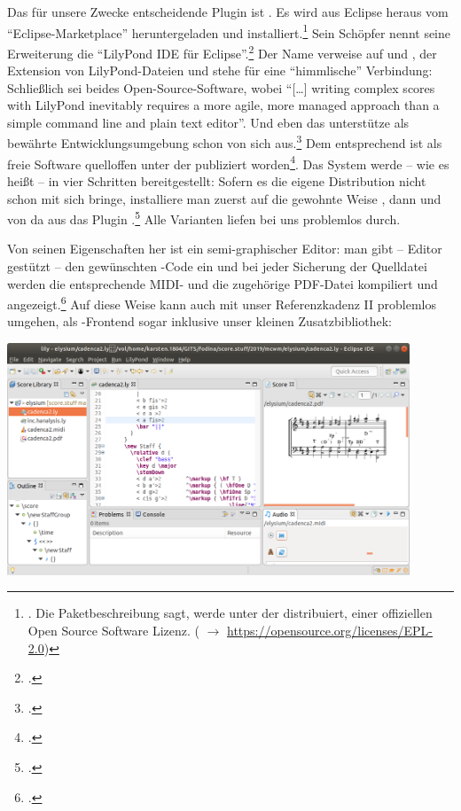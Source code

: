 Das für unsere Zwecke entscheidende Plugin ist . Es wird aus
Eclipse heraus vom \enquote{Eclipse-Marketplace} heruntergeladen und
installiert.\footnote{\cite[vgl.][\nopage wp.]{Harmath2019a}. Die
Paketbeschreibung sagt,  werde unter der  distribuiert, einer offiziellen Open Source Software Lizenz.
( $\rightarrow$ \href{https://opensource.org/licenses/EPL-2.0}
{https://opensource.org/licenses/EPL-2.0}) } Sein Schöpfer nennt seine
Erweiterung die \enquote{LilyPond IDE für Eclipse}.\footcite[vgl.][\nopage
wp.]{Harmath2019b} Der Name  verweise auf  und
, der Extension von LilyPond-Dateien und stehe für eine
\enquote{himmlische} Verbindung: Schließlich sei beides Open-Source-Software,
wobei \enquote{[\ldots] writing complex scores with LilyPond inevitably requires
a more agile, more managed approach than a simple command line and plain text
editor}. Und eben das unterstütze  als bewährte
Entwicklungsumgebung schon von sich aus.\footcite[vgl.][\nopage
wp.]{Harmath2019d} Dem entsprechend ist  als freie Software
quelloffen unter der  publiziert
worden\footcite[vgl.][\nopage wp.]{Harmath2018a}. Das System werde -- wie es
heißt -- in vier Schritten bereitgestellt: Sofern es die eigene Distribution
nicht schon mit sich bringe, installiere man zuerst auf die gewohnte Weise
, dann  und von da aus das Plugin
.\footcite[vgl.][\nopage wp.]{Harmath2019c} Alle Varianten liefen
bei uns problemlos durch.

Von seinen Eigenschaften her ist  ein semi-graphischer Editor: man
gibt -- Editor gestützt -- den gewünschten -Code ein und bei jeder
Sicherung der Quelldatei werden die entsprechende MIDI- und die zugehörige
PDF-Datei kompiliert und angezeigt.\footcite[vgl.][\nopage wp.]{Harmath2019e} Auf
diese Weise kann  auch mit unser Referenzkadenz II problemlos
umgehen, als -Frontend sogar inklusive unser kleinen
Zusatzbibliothek:

\begin{center}
\includegraphics[width=0.9\textwidth]{frontends/elysium/elysium-cadenca2-300dpi.png}
\end{center}

